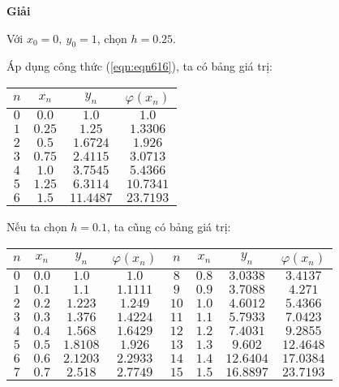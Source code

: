 \textbf{Giải}\par
Với $x_0=0,~y_0=1$, chọn $h=0.25$.\par
Áp dụng công thức (\ref{eqn:eqn616}), ta có bảng giá trị:\par
\begin{longtable}{|c|c|c|c|}\hline
	$n$ & $x_n$  & $y_n$     & $\varphi(x_n)$ \\\hline
	\endhead
	$0$ & $0.0$  & $1.0$     & $1.0$     \\\hline
	$1$ & $0.25$ & $1.25$    & $1.3306$  \\\hline
	$2$ & $0.5$  & $1.6724$  & $1.926$   \\\hline
	$3$ & $0.75$ & $2.4115$  & $3.0713$  \\\hline
	$4$ & $1.0$  & $3.7545$  & $5.4366$  \\\hline
	$5$ & $1.25$ & $6.3114$  & $10.7341$ \\\hline
	$6$ & $1.5$  & $11.4487$ & $23.7193$ \\\hline
\end{longtable}

Nếu ta chọn $h=0.1$, ta cũng có bảng giá trị:\par
\begin{longtable}{|c|c|c|c||c|c|c|c|}\hline
	$n$ & $x_n$ & $y_n$    & $\varphi(x_n)$ & $n$  & $x_n$  & $y_n$      & $\varphi(x_n)$\\ \hline
	\endhead
	$0$ & $0.0$ & $1.0$    & $1.0$          & $8$  & $0.8$  & $3.0338$  & $3.4137$      \\ \hline
	$1$ & $0.1$ & $1.1$    & $1.1111$       & $9$  & $0.9$  & $3.7088$  & $4.271$       \\ \hline
	$2$ & $0.2$ & $1.223$  & $1.249$        & $10$ & $1.0$  & $4.6012$  & $5.4366$      \\ \hline
	$3$ & $0.3$ & $1.376$  & $1.4224$       & $11$ & $1.1$  & $5.7933$  & $7.0423$      \\ \hline
	$4$ & $0.4$ & $1.568$  & $1.6429$       & $12$ & $1.2$  & $7.4031$  & $9.2855$      \\ \hline
	$5$ & $0.5$ & $1.8108$ & $1.926$        & $13$ & $1.3$  & $9.602$   & $12.4648$     \\ \hline
	$6$ & $0.6$ & $2.1203$ & $2.2933$       & $14$ & $1.4$  & $12.6404$ & $17.0384$     \\ \hline
	$7$ & $0.7$ & $2.518$  & $2.7749$       & $15$ & $1.5$  & $16.8897$ & $23.7193$     \\ \hline
\end{longtable}

